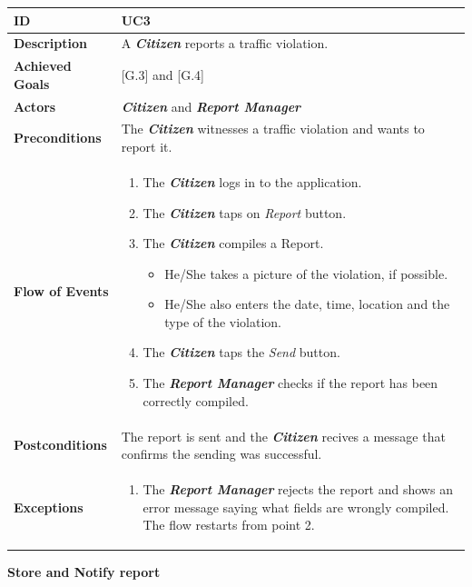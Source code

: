 \documentclass{report}
\begin{document}
\begin{tabularx}{\linewidth}{| l | X |}
	\hline
	\textbf{ID} & UC3\\
	
	\hline
	\textbf{Description} & A \textbf{\textit{Citizen}} reports a traffic violation.\\
	
	\hline
	\textbf{Achieved Goals} & {[G.3]} and {[G.4]}\\

	\hline
	\textbf{Actors} & \textbf{\textit{Citizen}} and \textbf{\textit{Report Manager}}\\
	
	\hline
	\textbf{Preconditions} & The \textbf{\textit{Citizen}} witnesses a traffic violation and wants to report it.\\
	
	\hline
	\textbf{Flow of Events} & \parbox{0.7\textwidth}{\begin{enumerate}
			\item The \textbf{\textit{Citizen}} logs in to the application.
			\item The \textbf{\textit{Citizen}} taps on \textit{Report} button.
			\item The \textbf{\textit{Citizen}} compiles a Report.
			\begin{itemize}
				\item He/She takes a picture of the violation, if possible.
				\item He/She also enters the date, time, location and the type of the violation.			
			\end{itemize}
			\item The \textbf{\textit{Citizen}} taps the \textit{Send} button.
			\item The \textbf{\textit{Report Manager}} checks if the report has been correctly compiled.		
	\end{enumerate}}\\
	
	\hline
	\textbf{Postconditions} & The report is sent and the \textbf{\textit{Citizen}} recives a message that confirms the sending was successful.\\
	
	\hline
	\textbf{Exceptions} & \parbox{0.7\textwidth}{ \begin{enumerate}
			\item The \textbf{\textit{Report Manager}} rejects the report and shows an error message saying what fields are wrongly compiled. The flow restarts from point 2. 
		\end{enumerate}}\\
	
	\hline
	
\end{tabularx}
\begin{center}
	\textbf{Store and Notify report}
\end{center}
\end{document}
